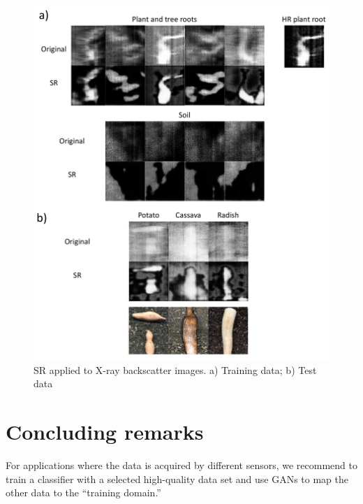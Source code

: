 \documentclass[10pt,twocolumn,letterpaper]{article}
\begin{document}
\begin{figure}[h]
\begin{center}
\includegraphics[scale=0.70]{results/srxray.pdf}
\end{center}
   \caption{SR applied to X-ray backscatter images. a) Training data; b) Test data}
\label{fig:srtest}
\end{figure}

\section{Concluding remarks}

For applications where the data is acquired by different sensors, we recommend to train a classifier with a selected high-quality data set and use GANs to map the other data to the ``training domain.''


{\small


}
\end{document}
